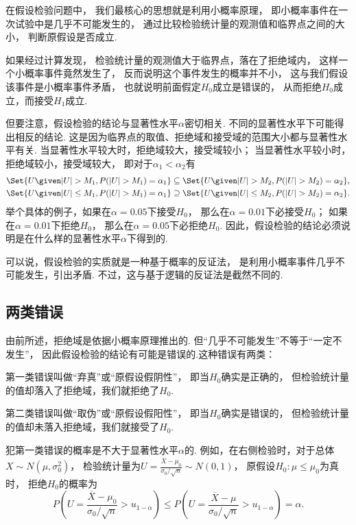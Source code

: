 在假设检验问题中，
我们最核心的思想就是利用小概率原理，
即小概率事件在一次试验中是几乎不可能发生的，
通过比较检验统计量的观测值和临界点之间的大小，
判断原假设是否成立.

如果经过计算发现，
检验统计量的观测值大于临界点，落在了拒绝域内，
这样一个小概率事件竟然发生了，
反而说明这个事件发生的概率并不小，
这与我们假设该事件是小概率事件矛盾，
也就说明前面假定\(H_0\)成立是错误的，
从而拒绝\(H_0\)成立，而接受\(H_1\)成立.

但要注意，假设检验的结论与显著性水平\(\alpha\)密切相关.
不同的显著性水平下可能得出相反的结论.
这是因为临界点的取值、拒绝域和接受域的范围大小都与显著性水平有关.
当显著性水平较大时，拒绝域较大，接受域较小；
当显著性水平较小时，拒绝域较小，接受域较大，
即对于\(\alpha_1 < \alpha_2\)有\begin{gather*}
	\Set{ U \given \abs{U} > M_1, P(\abs{U} > M_1) = \alpha_1 }
	\subseteq
	\Set{ U \given \abs{U} > M_2, P(\abs{U} > M_2) = \alpha_2 }, \\
	\Set{ U \given \abs{U} \leq M_1, P(\abs{U} > M_1) = \alpha_1 }
	\supseteq
	\Set{ U \given \abs{U} \leq M_2, P(\abs{U} > M_2) = \alpha_2 }.
\end{gather*}
举个具体的例子，如果在\(\alpha=0.05\)下接受\(H_0\)，
那么在\(\alpha=0.01\)下必接受\(H_0\)；
如果在\(\alpha=0.01\)下拒绝\(H_0\)，
那么在\(\alpha=0.05\)下必拒绝\(H_0\).
因此，假设检验的结论必须说明是在什么样的显著性水平\(\alpha\)下得到的.

可以说，假设检验的实质就是一种基于概率的反证法，
是利用小概率事件几乎不可能发生，引出矛盾.
不过，这与基于逻辑的反证法是截然不同的.

\subsection{两类错误}
由前所述，拒绝域是依据小概率原理推出的.
但“几乎不可能发生”不等于“一定不发生”，
因此假设检验的结论有可能是错误的.这种错误有两类：

第一类错误叫做“弃真”或“原假设假阴性”，
即当\(H_0\)确实是正确的，
但检验统计量的值却落入了拒绝域，我们就拒绝了\(H_0\).

第二类错误叫做“取伪”或“原假设假阳性”，
即当\(H_0\)确实是错误的，
但检验统计量的值却未落入拒绝域，我们就接受了\(H_0\).

犯第一类错误的概率是不大于显著性水平\(\alpha\)的.
例如，在右侧检验时，对于总体\(X \sim N(\mu,\sigma_0^2)\)，
检验统计量为\(U = \frac{\overline{X}-\mu_0}{\sigma_0 / \sqrt{n}} \sim N(0,1)\)，
原假设\(H_0: \mu\leq\mu_0\)为真时，
拒绝\(H_0\)的概率为\begin{equation*}
	P\left(U=\frac{\overline{X}-\mu_0}{\sigma_0 / \sqrt{n}}>u_{1-\alpha}\right)
	\leq P\left(U=\frac{\overline{X}-\mu}{\sigma_0 / \sqrt{n}}>u_{1-\alpha}\right)
	= \alpha.
\end{equation*}

